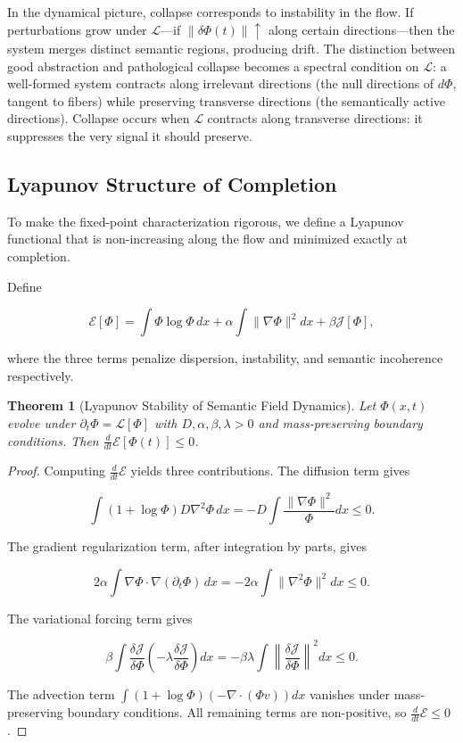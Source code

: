 \documentclass[11pt, twoside]{article}
\theoremstyle{plain}
\newtheorem{theorem}{Theorem}[section]
\theoremstyle{definition}
\theoremstyle{remark}
\begin{document}
In the dynamical picture, collapse corresponds to instability in the flow. If perturbations grow under $\mathcal{L}$---if $\|\delta\Phi(t)\| \uparrow$ along certain directions---then the system merges distinct semantic regions, producing drift. The distinction between good abstraction and pathological collapse becomes a spectral condition on $\mathcal{L}$: a well-formed system contracts along irrelevant directions (the null directions of $d\Phi$, tangent to fibers) while preserving transverse directions (the semantically active directions). Collapse occurs when $\mathcal{L}$ contracts along transverse directions: it suppresses the very signal it should preserve.

\subsection{Lyapunov Structure of Completion}

To make the fixed-point characterization rigorous, we define a Lyapunov functional that is non-increasing along the flow and minimized exactly at completion.

Define

\[
\mathcal{E}[\Phi] = \int \Phi \log \Phi \, dx + \alpha \int \|\nabla \Phi\|^2 dx + \beta \mathcal{J}[\Phi],
\]

where the three terms penalize dispersion, instability, and semantic incoherence respectively.

\begin{theorem}[Lyapunov Stability of Semantic Field Dynamics]
\label{thm:lyapunov}
Let $\Phi(x,t)$ evolve under $\partial_t \Phi = \mathcal{L}[\Phi]$ with $D, \alpha, \beta, \lambda > 0$ and mass-preserving boundary conditions. Then $\frac{d}{dt}\mathcal{E}[\Phi(t)] \leq 0$.
\end{theorem}

\begin{proof}
Computing $\frac{d}{dt}\mathcal{E}$ yields three contributions. The diffusion term gives

\[
\int (1 + \log \Phi) D\nabla^2\Phi \, dx = -D\int \frac{\|\nabla\Phi\|^2}{\Phi} dx \leq 0.
\]

The gradient regularization term, after integration by parts, gives

\[
2\alpha \int \nabla\Phi \cdot \nabla(\partial_t\Phi) \, dx = -2\alpha \int \|\nabla^2\Phi\|^2 dx \leq 0.
\]

The variational forcing term gives

\[
\beta \int \frac{\delta\mathcal{J}}{\delta\Phi} \left(-\lambda \frac{\delta\mathcal{J}}{\delta\Phi}\right) dx = -\beta\lambda \int \left\|\frac{\delta\mathcal{J}}{\delta\Phi}\right\|^2 dx \leq 0.
\]

The advection term $\int (1 + \log\Phi)(-\nabla \cdot (\Phi v)) dx$ vanishes under mass-preserving boundary conditions. All remaining terms are non-positive, so $\frac{d}{dt}\mathcal{E} \leq 0$.
\end{proof}
\end{document}

